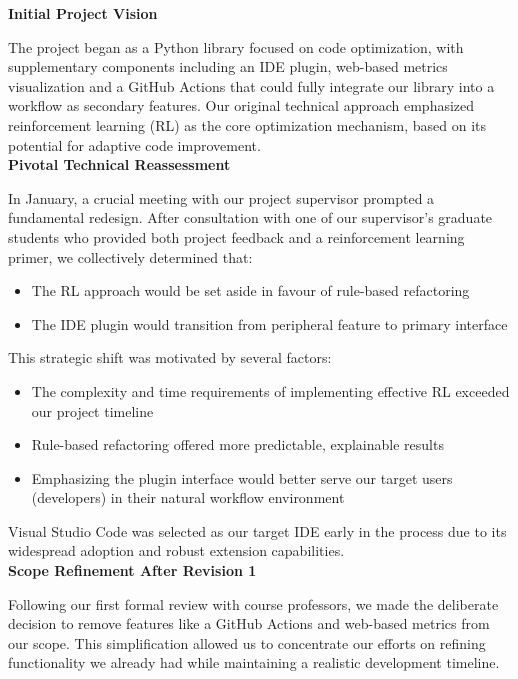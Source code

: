 \documentclass{article}
\begin{document}
\noindent \textbf{Initial Project Vision}

\noindent
The project began as a Python library focused on code optimization, with supplementary components including an IDE plugin, web-based metrics visualization and a GitHub Actions that could fully integrate our library into a workflow as secondary features. Our original technical approach emphasized reinforcement learning (RL) as the core optimization mechanism, based on its potential for adaptive code improvement.\\


\noindent \textbf{Pivotal Technical Reassessment}

\noindent
In January, a crucial meeting with our project supervisor prompted a fundamental redesign. After consultation with one of our supervisor's graduate students who provided both project feedback and a reinforcement learning primer, we collectively determined that:

\begin{itemize}
    \item The RL approach would be set aside in favour of rule-based refactoring
    \item The IDE plugin would transition from peripheral feature to primary interface
\end{itemize}

This strategic shift was motivated by several factors:
\begin{itemize}
    \item The complexity and time requirements of implementing effective RL exceeded our project timeline
    \item Rule-based refactoring offered more predictable, explainable results
    \item Emphasizing the plugin interface would better serve our target users (developers) in their natural workflow environment
\end{itemize}

Visual Studio Code was selected as our target IDE early in the process due to its widespread adoption and robust extension capabilities.\\


\noindent \textbf{Scope Refinement After Revision 1}

\noindent
Following our first formal review with course professors, we made the deliberate decision to remove features like a GitHub Actions and web-based metrics from our scope. This simplification allowed us to concentrate our efforts on refining functionality we already had while maintaining a realistic development timeline.\\
\end{document}
